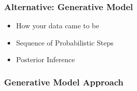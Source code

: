 \begin{frame}

\frametitle{Alternative: Generative Model}

\begin{itemize}
  \item How your data came to be
  \item Sequence of Probabilistic Steps
  \item Posterior Inference
\end{itemize}

\end{frame}

\begin{frame}
  \frametitle{Generative Model Approach}

\begin{center}

\end{center}
\end{frame}

